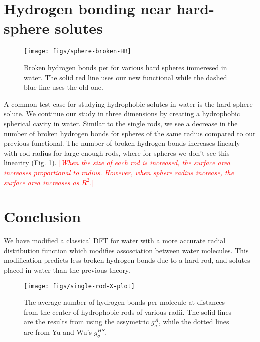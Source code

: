 \documentclass[twocolumn,amsmath,amssymb,prl]{revtex4-1}
\newcommand{\fixme}[1]{\textcolor{red}{[\emph{#1}]}}
\begin{document}
\section{Hydrogen bonding near hard-sphere solutes}

\begin{figure}
\begin{center}
\texttt{[image: figs/sphere-broken-HB]}
\end{center}
\caption{Broken hydrogen bonds per for various hard spheres
  immeresed in water.  The solid red line uses our new functional
  while the dashed blue line uses the old one.}
\label{fig:spheres-broken-HB}
\end{figure}

A common test case for studying hydrophobic solutes in water is the
hard-sphere solute. We continue our study in three dimensions by
creating a hydrophobic spherical cavity in water. Similar to the
single rods, we see a decrease in the number of broken hydrogen bonds
for spheres of the same radius compared to our previous
functional. The number of broken hydrogen bonds increases linearly
with rod radius for large enough rods, where for spheres we don't see
this linearity (Fig. \ref{fig:spheres-broken-HB}). \fixme{When the
  size of each rod is increased, the surface area increases
  proportional to radius.  However, when sphere radius increase, the
  surface area increases as $R^2$.}

\section{Conclusion}

We have modified a classical DFT for water with a more accurate radial
distribution function which modifies assosciation between water
molecules. This modification predicts less broken hydrogen bonds due
to a hard rod, and solutes placed in water than the previous theory.

\clearpage
  
\begin{figure}
\begin{center}
\texttt{[image: figs/single-rod-X-plot]}
\end{center}
\caption{ The average number of hydrogen bonds per molecule at
  distances from the center of hydrophobic rods of various
  radii. The solid lines are the results from using the assymetric
  $g_{\sigma}^A$, while the dotted lines are from Yu and Wu's $g_{\sigma}^{HS}$.}
\label{fig:single-rod-X}
\end{figure}
\end{document}

